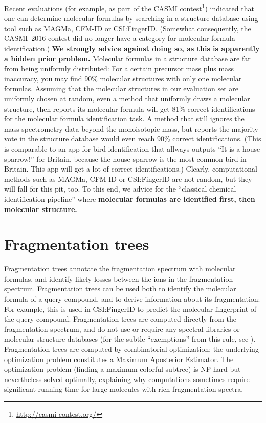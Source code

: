 \documentclass[letterpaper,10pt,openany,oneside]{sphinxmanual}
\begin{document}
Recent evaluations (for example, as part of the CASMI
contest\footnote{\sphinxAtStartFootnote\url{http://casmi-contest.org/}})
indicated that one can determine molecular formulas by searching in a
structure database using tool such as MAGMa, CFM-ID or CSI:FingerID.
(Somewhat consequently, the CASMI~2016 contest did no longer have a category
for molecular formula identification.)  \textbf{We strongly advice against
doing so, as this is apparently a hidden prior problem.}  Molecular formulas
in a structure database are far from being uniformly distributed: For a
certain precursor mass plus mass inaccuracy, you may find 90\% molecular
structures with only one molecular formulas.  Assuming that the molecular
structures in our evaluation set are uniformly chosen at random, even a
method that uniformly draws a molecular structure, then reports its molecular
formula will get 81\% correct identifications for the molecular formula
identification task.  A method that still ignores the mass spectrometry data
beyond the monoisotopic mass, but reports the majority vote in the structure
database would even reach 90\% correct identifications.  (This is comparable
to an app for bird identification that allways outputs ``It is a house
sparrow!'' for Britain, because the house sparrow is the most common bird in
Britain.  This app will get a lot of correct identifications.)  Clearly,
computational methods such as MAGMa, CFM-ID or CSI:FingerID are not random,
but they will fall for this pit, too.  To this end, we advice for the
``classical chemical identification pipeline'' where \textbf{molecular
formulas are identified first, then molecular structure.}



\section{Fragmentation trees}

Fragmentation trees annotate the fragmentation spectrum with molecular
formulas, and identify likely losses between the ions in the fragmentation
spectrum.  Fragmentation trees can be used both to identify the molecular
formula of a query compound, and to derive information about its
fragmentation: For example, this is used in CSI:FingerID to predict the
molecular fingerprint of the query compound.  Fragmentation trees are
computed directly from the fragmentation spectrum, and do not use or require
any spectral libraries or molecular structure databases (for the subtle
``exemptions'' from this rule, see \citet{boecker16fragmentation}).
Fragmentation trees are computed by combinatorial optimization; the
underlying optimization problem constitutes a Maximum Aposterior Estimator.
The optimization problem (finding a maximum colorful subtree) is NP-hard but
nevertheless solved optimally, explaining why computations sometimes require
significant running time for large molecules with rich fragmentation spectra.
\end{document}
